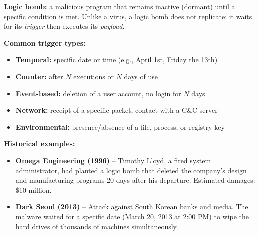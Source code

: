 \documentclass[a4paper,11pt]{article}
\theoremstyle{plain}
\theoremstyle{definition}
\begin{document}
\begin{rappel}
\textbf{Logic bomb:} a malicious program that remains inactive (dormant) until a specific condition is met. Unlike a virus, a logic bomb does not replicate: it waits for its \textit{trigger} then executes its \textit{payload}.

\medskip
\textbf{Common trigger types:}
\begin{itemize}
    \item \textbf{Temporal:} specific date or time (e.g., April 1st, Friday the 13th)
    \item \textbf{Counter:} after $N$ executions or $N$ days of use
    \item \textbf{Event-based:} deletion of a user account, no login for $N$ days
    \item \textbf{Network:} receipt of a specific packet, contact with a C\&C server
    \item \textbf{Environmental:} presence/absence of a file, process, or registry key
\end{itemize}

\medskip
\textbf{Historical examples:}
\begin{itemize}
    \item \textbf{Omega Engineering (1996)} -- Timothy Lloyd, a fired system administrator, had planted a logic bomb that deleted the company's design and manufacturing programs 20 days after his departure. Estimated damages: \$10 million.
    \item \textbf{Dark Seoul (2013)} -- Attack against South Korean banks and media. The malware waited for a specific date (March 20, 2013 at 2:00 PM) to wipe the hard drives of thousands of machines simultaneously.
\end{itemize}
\end{rappel}
\end{document}
